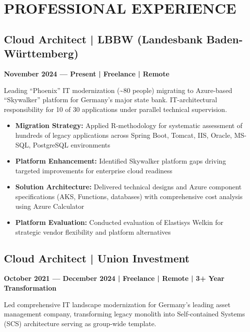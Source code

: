 \documentclass[11pt,a4paper]{article}
\begin{document}
\vfill

\newpage

\section{PROFESSIONAL EXPERIENCE}

\subsection{Cloud Architect | LBBW (Landesbank Baden-Württemberg)}
\textbf{November 2024 --- Present | Freelance | Remote}

Leading ``Phoenix'' IT modernization (\textasciitilde{}80 people) migrating to Azure-based ``Skywalker'' platform for Germany's major state bank. IT-architectural responsibility for 10 of 30 applications under parallel technical supervision.

\begin{itemize}
\item \textbf{Migration Strategy:} Applied R-methodology for systematic assessment of hundreds of legacy applications across Spring Boot, Tomcat, IIS, Oracle, MS-SQL, PostgreSQL environments
\item \textbf{Platform Enhancement:} Identified Skywalker platform gaps driving targeted improvements for enterprise cloud readiness
\item \textbf{Solution Architecture:} Delivered technical designs and Azure component specifications (AKS, Functions, databases) with comprehensive cost analysis using Azure Calculator
\item \textbf{Platform Evaluation:} Conducted evaluation of Elastisys Welkin for strategic vendor flexibility and platform alternatives
\end{itemize}

\subsection{Cloud Architect | Union Investment}
\textbf{October 2021 --- December 2024 | Freelance | Remote | 3+ Year Transformation}

Led comprehensive IT landscape modernization for Germany's leading asset management company, transforming legacy monolith into Self-contained Systems (SCS) architecture serving as group-wide template.
\end{document}
